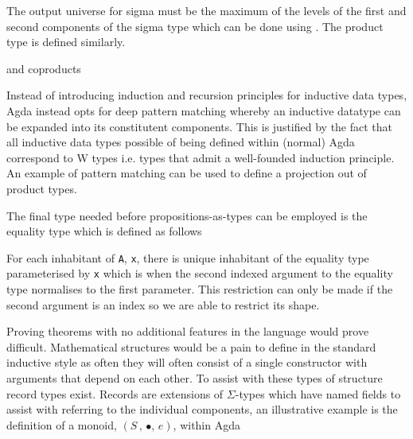 
The output universe for sigma must be the maximum of the levels of the first and
second components of the sigma type which can be done using . The
product type is defined similarly.


and coproducts


Instead of introducing induction and recursion principles for inductive data
types, Agda instead opts for deep pattern matching whereby an inductive datatype
can be expanded into its constitutent components. This is justified by the fact
that all inductive data types possible of being defined within (normal) Agda
correspond to W types i.e. types that admit a well-founded induction principle.
An example of pattern matching can be used to define a projection out of product
types.



The final type needed before propositions-as-types can be employed is the
equality type which is defined as follows


For each inhabitant of \verb|A|, \verb|x|, there is unique inhabitant of the
equality type parameterised by \verb|x| which is when the second indexed
argument to the equality type normalises to the first parameter. This
restriction can only be made if the second argument is an index so we are able
to restrict its shape.

Proving theorems with no additional features in the language would prove
difficult. Mathematical structures would be a pain to define in the standard
inductive style as often they will often consist of a single constructor with
arguments that depend on each other. To assist with these types of structure
record types exist. Records are extensions of $\Sigma$-types which have named
fields to assist with referring to the individual components, an illustrative
example is the definition of a monoid, $(S \, , \, \bullet , \, e)$, within Agda


